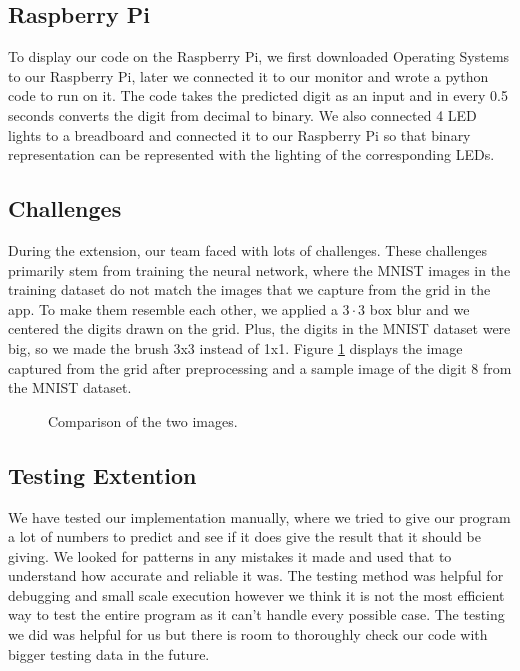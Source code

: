 \documentclass{article}
\begin{document}
\subsection{Raspberry Pi}
To display our code on the Raspberry Pi, we first downloaded Operating Systems to our Raspberry Pi, later we connected it to our monitor and wrote a python code to run on it. The code takes the predicted digit as an input and in every 0.5 seconds converts the digit from decimal to binary. We also connected 4 LED lights to a breadboard and connected it to our Raspberry Pi so that binary representation can be represented with the lighting of the corresponding LEDs.

\subsection{Challenges}
During the extension, our team faced with lots of challenges. These challenges primarily stem from training the neural network, where the MNIST images in the training dataset do not match the images that we capture from the grid in the app. To make them resemble each other, we applied a $3\cdot3$ box blur and we centered the digits drawn on the grid. Plus, the digits in the MNIST dataset were big, so we made the brush 3x3 instead of 1x1. Figure \ref{fig:combined} displays the image captured from the grid after preprocessing and a sample image of the digit 8 from the MNIST dataset.

\begin{figure}[h!]
    \centering
    \caption{Comparison of the two images.}
    \label{fig:combined}
\end{figure}

\subsection{Testing Extention}
We have tested our implementation manually, where we tried to give our program a lot of numbers to predict and see if it does give the result that it should be giving. We looked for patterns in any mistakes it made and used that to understand how accurate and reliable it was. The testing method was helpful for debugging and small scale execution however we think it is not the most efficient way to test the entire program as it can't handle every possible case. The testing we did was helpful for us but there is room to thoroughly check our code with bigger testing data in the future.
\end{document}
